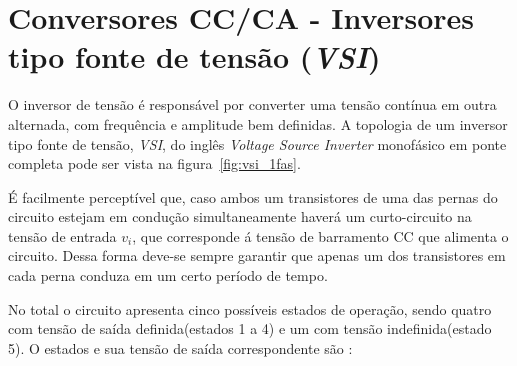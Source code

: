 \documentclass[
	12pt,				%
	openright,			%
	onseside,
	a4paper,			%
	english,			%
	french,				%
	spanish,			%
	brazil,				%
	]{abntex2}
\begin{document}
\section{Conversores CC/CA - Inversores tipo fonte de tensão (\textit{VSI})}




O inversor de tensão é responsável por converter uma tensão contínua em outra alternada, com frequência e amplitude bem definidas. A topologia de um inversor tipo fonte de tensão, \emph{VSI}, do inglês \textit{Voltage Source Inverter} monofásico em ponte completa pode ser vista na figura~\ref{fig:vsi_1fas}. 

É facilmente perceptível que, caso ambos um transistores de uma das pernas do circuito estejam em condução simultaneamente haverá um curto-circuito na tensão de entrada $v_i$, que corresponde á tensão de barramento CC que alimenta o circuito. Dessa forma deve-se sempre garantir que apenas um dos transistores em cada perna conduza em um certo período de tempo.

No total o circuito apresenta cinco possíveis estados de operação, sendo quatro com tensão de saída definida(estados 1 a 4) e um com tensão indefinida(estado 5). O estados e sua tensão de saída correspondente são \cite{RASHID_VSI}:
\end{document}
